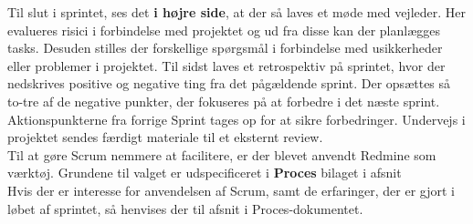 \documentclass[Rapport/Rapport_main.tex]{subfiles}
\begin{document}
Til slut i sprintet, ses det \textbf{i højre side}, at der så laves et møde med vejleder. Her evalueres risici i forbindelse med projektet og ud fra disse kan der planlægges tasks. Desuden stilles der forskellige spørgsmål i forbindelse med usikkerheder eller problemer i projektet.  Til sidst laves et retrospektiv på sprintet, hvor der nedskrives positive og negative ting fra det pågældende sprint. Der opsættes så to-tre af de negative punkter, der fokuseres på at forbedre i det næste sprint. Aktionspunkterne fra forrige Sprint tages op for at sikre forbedringer. Undervejs i projektet sendes færdigt materiale til et eksternt review.\\

Til at gøre Scrum nemmere at facilitere, er der blevet anvendt Redmine som værktøj. Grundene til valget er udspecificeret i \textbf{Proces} bilaget i afsnit \\
Hvis der er interesse for anvendelsen af Scrum, samt de erfaringer, der er gjort i løbet af sprintet, så henvises der til afsnit  i Proces-dokumentet.
\end{document}
